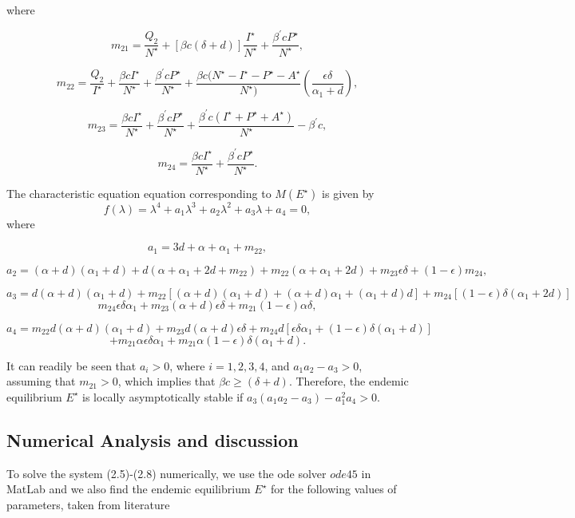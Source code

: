 where

$$
m_{21} = \frac{Q_{2}}{N^{\star}} + [\beta c(\delta+d)]\frac{I^{\star}}{N^{\star}} + \frac{\beta^{\prime}cP^{\star}}{N^{\star}},
$$

$$
m_{22} = \frac{Q_{2}}{I^{\star}} + \frac{\beta cI^{\star}}{N^{\star}} + \frac{\beta^{\prime} cP^{\star}}{N^{\star}} + \frac{\beta c(N^{\star}-I^{\star}-P^{\star}-A^{\star}}{N^{\star})}\left(\frac{\epsilon\delta}{\alpha_{1}+d}\right),
$$

$$
m_{23} = \frac{\beta cI^{\star}}{N^{\star}} + \frac{\beta^{\prime} cP^{\star}}{N^{\star}} + \frac{\beta^{\prime} c(I^{\star}+P^{\star}+A^{\star})}{N^{\star}} - \beta^{\prime}c,
$$

$$
m_{24} = \frac{\beta cI^{\star}}{N^{\star}} + \frac{\beta^{\prime}cP^{\star}}{N^{\star}}.
$$

The characteristic equation equation corresponding to $M(E^{\star})$ is given by
$$
f(\lambda) = \lambda^{4}+ a_{1}\lambda^{3} + a_{2}\lambda^{2} + a_{3}\lambda + a_{4} = 0,
$$
where

$$
a_{1} = 3d + \alpha + \alpha_{1} + m_{22},
$$

$$
a_{2} = (\alpha+d)(\alpha_{1}+d) + d(\alpha+\alpha_{1}+2d+m_{22}) + m_{22}(\alpha+\alpha_{1}+2d) + m_{23}\epsilon\delta+(1-\epsilon)m_{24},
$$

$$
a_{3} = d(\alpha+d)(\alpha_{1}+d) + m_{22}[(\alpha+d)(\alpha_{1}+d) + (\alpha+d)\alpha_{1}+(\alpha_{1}+d)d] + m_{24}[(1-\epsilon)\delta(\alpha_{1}+2d)]$$
$$m_{24}\epsilon\delta\alpha_{1} + m_{23}(\alpha+d)\epsilon\delta + m_{21}(1-\epsilon)\alpha\delta,
$$

$$
a_{4} = m_{22}d(\alpha+d)(\alpha_{1}+d) + m_{23}d(\alpha+d)\epsilon\delta + m_{24}d[\epsilon\delta\alpha_{1} + (1-\epsilon)\delta(\alpha_{1}+d)]$$
$$
+m_{21}\alpha\epsilon\delta\alpha_{1} + m_{21}\alpha(1-\epsilon)\delta(\alpha_{1}+d).
$$

It can readily be seen that $a_{i} > 0 $, where $i=1,2,3,4$, and $a_{1}a_{2}-a_{3}>0$, assuming that $m_{21} >0$, which implies that $\beta c \geq (\delta+d)$. Therefore, the endemic equilibrium $E^{\star}$ is locally asymptotically stable if $a_{3}(a_{1}a_{2}-a_{3}) - a_{1}^{2}a_{4} > 0$.

\subsection{Numerical Analysis and discussion}
To solve the system (2.5)-(2.8) numerically, we use the ode solver $\textit{ode45}$ in MatLab and we also find the endemic equilibrium $E^{\star}$ for the following values of parameters, taken from literature\\

